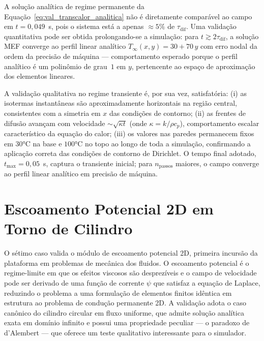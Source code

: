 A solução analítica de regime permanente da Equação~\eqref{eq:val_transcalor_analitica} não é diretamente comparável ao campo em $t = 0{,}049$~s, pois o sistema está a apenas $\approx 5\%$ de $\tau_{\mathrm{dif}}$. Uma validação quantitativa pode ser obtida prolongando-se a simulação: para $t \gtrsim 2\tau_{\mathrm{dif}}$, a solução MEF converge ao perfil linear analítico $T_{\infty}(x, y) = 30 + 70\,y$ com erro nodal da ordem da precisão de máquina --- comportamento esperado porque o perfil analítico é um polinômio de grau~$1$ em $y$, pertencente ao espaço de aproximação dos elementos lineares.

A validação qualitativa no regime transiente é, por sua vez, satisfatória: (i) as isotermas instantâneas são aproximadamente horizontais na região central, consistentes com a simetria em $x$ das condições de contorno; (ii) as frentes de difusão avançam com velocidade $\sim \sqrt{\kappa t}$ (onde $\kappa = k / \rho c_p$), comportamento escalar característico da equação do calor; (iii) os valores nas paredes permanecem fixos em $30$°C na base e $100$°C no topo ao longo de toda a simulação, confirmando a aplicação correta das condições de contorno de Dirichlet. O tempo final adotado, $t_{\max} = 0{,}05$~s, captura o transiente inicial; para $n_{\mathrm{passos}}$ maiores, o campo converge ao perfil linear analítico em precisão de máquina.


\section{Escoamento Potencial 2D em Torno de Cilindro}
\label{sec:val_potencial}

O sétimo caso valida o módulo de escoamento potencial 2D, primeira incursão da plataforma em problemas de mecânica dos fluidos. O escoamento potencial é o regime-limite em que os efeitos viscosos são desprezíveis e o campo de velocidade pode ser derivado de uma função de corrente $\psi$ que satisfaz a equação de Laplace, reduzindo o problema a uma formulação de elementos finitos idêntica em estrutura ao problema de condução permanente 2D. A validação adota o caso canônico do cilindro circular em fluxo uniforme, que admite solução analítica exata em domínio infinito e possui uma propriedade peculiar --- o paradoxo de d'Alembert --- que oferece um teste qualitativo interessante para o simulador.

